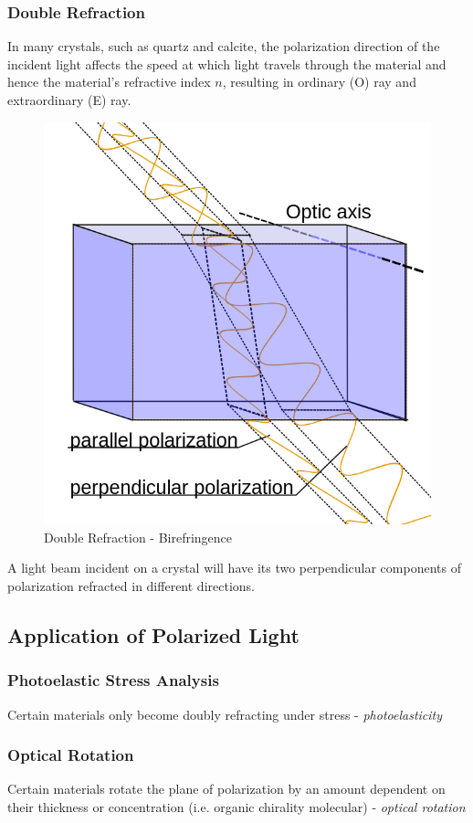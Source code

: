\documentclass[openany]{book}
\begin{document}
\subsubsection{Double Refraction}
In many crystals, such as quartz and calcite, the polarization direction of the incident light affects the speed at which light travels through the material and hence the material's refractive index $n$, resulting in ordinary (O) ray and extraordinary (E) ray.
\begin{figure}[H]
\centering
\label{fig:16}
\includegraphics[scale=0.25]{Figure/16.PNG}
\caption{Double Refraction - Birefringence}
\end{figure}
A light beam incident on a crystal will have its two perpendicular components of polarization refracted in different directions.
\subsection{Application of Polarized Light}
\subsubsection{Photoelastic Stress Analysis}
Certain materials only become doubly refracting under stress - \emph{photoelasticity}
\subsubsection{Optical Rotation}
Certain materials rotate the plane of polarization by an amount dependent on their thickness or concentration (i.e. organic chirality molecular) - \emph{optical rotation}
\end{document}

